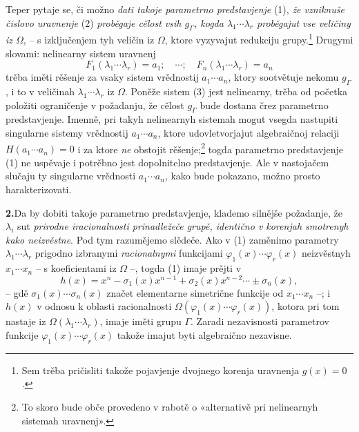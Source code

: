 \documentclass[11pt]{article}
\begin{document}
Teper pytaje se, či možno {\itshape dati takoje parametrno predstavjenje} (1), {\itshape že vzniknuše čislovo uravnenje} (2) {\itshape proběgaje cělost vsih $g_\Gamma$, kogda $\lambda_1\cdots\lambda_r$ proběgajut vse veličiny iz $\Omega$}, -- s izključenjem tyh veličin iz $\Omega$, ktore vyzyvajut redukciju grupy.\footnote{Sem trěba pričisliti takože pojavjenje dvojnego korenja uravnenja $g(x)=0$.} Drugymi slovami: nelinearny sistem uravnenj
\begin{equation}
 F_1(\lambda_1\cdots\lambda_r)=a_1;\quad \cdots;\quad F_n(\lambda_1\cdots\lambda_r)=a_n
\tag{3}
\end{equation}
trěba iměti rěšenje za vsaky sistem vrědnostij $a_1\cdots a_n$, ktory sootvětuje nekomu $g_\Gamma$, i to v veličinah $\lambda_1\cdots\lambda_r$ iz $\Omega$. Poněže sistem (3) jest nelinearny, trěba od početka položiti ograničenje v požadanju, že cělost $g_\Gamma$ bude dostana črez parametrno predstavjenje. Imenně, pri takyh nelinearnyh sistemah mogut vsegda nastupiti singularne sistemy vrědnostij $a_1\cdots a_n$, ktore udovletvorjajut algebraičnoj relaciji $H(a_1\cdots a_n)=0$ i za ktore {\itshape ne} obstojit rěšenje;\footnote{To skoro bude obče provedeno v rabotě o «alternativě pri nelinearnyh sistemah uravnenj».} togda parametrno predstavjenje (1) ne uspěvaje i potrěbno jest dopolnitelno predstavjenje. Ale v nastojačem slučaju ty singularne vrědnosti $a_1\cdots a_n$, kako bude pokazano, možno prosto harakterizovati.

\noindent\textbf{2.}\quad Da by dobiti takoje parametrno predstavjenje, klademo silnějše požadanje, že $\lambda_i$ sut {\itshape prirodne iracionalnosti prinadležeče grupě, identično v korenjah smotrenyh kako neizvěstne}. Pod tym razumějemo slědeče. Ako v (1) zaměnimo parametry $\lambda_1\cdots\lambda_r$ prigodno izbranymi {\itshape racionalnymi} funkcijami $\varphi_1(x)\cdots\varphi_r(x)$ neizvěstnyh $x_1\cdots x_n$ -- s koeficientami iz $\Omega$ --, togda (1) imaje prějti v
\begin{equation}
 h(x)=x^n-\sigma_1(x)x^{n-1}+\sigma_2(x)x^{n-2}\cdots\pm\sigma_n(x),
\tag{4}
\end{equation}
-- gdě $\sigma_1(x)\cdots\sigma_n(x)$ značet elementarne simetrične funkcije od $x_1\cdots x_n$ --; i $h(x)$ v odnosu k oblasti racionalnosti $\Omega(\varphi_1(x)\cdots\varphi_r(x))$, kotora pri tom nastaje iz $\Omega(\lambda_1\cdots\lambda_r)$, imaje iměti grupu $\Gamma$. Zaradi nezavisnosti parametrov funkcije $\varphi_1(x)\cdots\varphi_r(x)$ takože imajut byti algebraično nezavisne.
\end{document}
